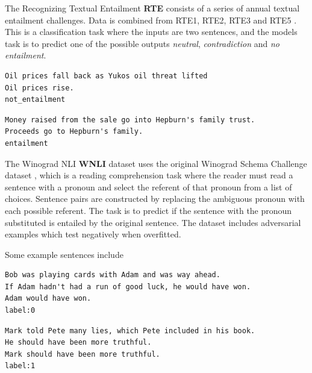 \documentclass[a4paper,12pt,oneside,openright]{report}
\begin{document}
The Recognizing Textual Entailment \textbf{RTE} consists of a series of annual textual entailment challenges. 
Data is combined from RTE1, RTE2, RTE3 and RTE5 \cite{dagan2005} \cite{bar2006} \cite{bentivogli2009} \cite{giampiccolo2007}. 
This is a classification task where the inputs are two sentences, and the models task is to predict one of the possible outputs \textit{neutral}, \textit{contradiction} and \textit{no entailment}.

\begin{tcolorbox}
\begin{verbatim}
Oil prices fall back as Yukos oil threat lifted	
Oil prices rise.
not_entailment
\end{verbatim}
\end{tcolorbox}

\begin{tcolorbox}
\begin{verbatim}
Money raised from the sale go into Hepburn's family trust.
Proceeds go to Hepburn's family.	
entailment
\end{verbatim}
\end{tcolorbox}

The Winograd NLI \textbf{WNLI} dataset uses the original Winograd Schema Challenge dataset \cite{levesque2012}, which is a reading comprehension task where the reader must read a sentence with a pronoun and select the referent of that pronoun from a list of choices. 
Sentence pairs are constructed by replacing the ambiguous pronoun with each possible referent.
The task is to predict if the sentence with the pronoun substituted is entailed by the original sentence.
The dataset includes adversarial examples which test negatively when overfitted.

Some example sentences include 

\begin{tcolorbox}
\begin{verbatim}
Bob was playing cards with Adam and was way ahead.
If Adam hadn't had a run of good luck, he would have won.	
Adam would have won.
label:0
\end{verbatim}
\end{tcolorbox}

\begin{tcolorbox}
\begin{verbatim}
Mark told Pete many lies, which Pete included in his book. 
He should have been more truthful.	
Mark should have been more truthful.
label:1
\end{verbatim}
\end{tcolorbox}
\end{document}
